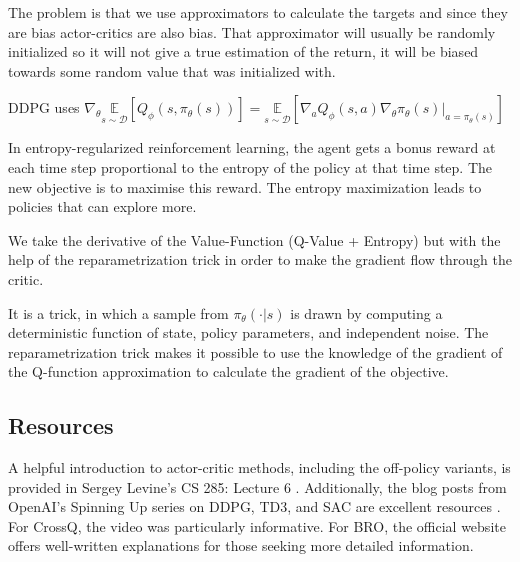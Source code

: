 \begin{enumerate}
\newline
The problem is that we use approximators to calculate the targets and since they are bias actor-critics are also bias. That approximator will usually be randomly initialized so it will not give a true estimation of the return, it will be biased towards some random value that was initialized with.

\newline DDPG uses $ \nabla_\theta  \underset{s\sim \mathcal{D}}{\mathbb{E}}[Q_\phi(s,\pi_\theta(s))]
=  \underset{s\sim \mathcal{D}}{\mathbb{E}}\left[ \nabla_a Q_\phi(s,a) \nabla_\theta \pi_\theta(s)|_{a=\pi_\theta(s)}\right]
$

\newline In entropy-regularized reinforcement learning, the agent gets a bonus 
reward at each time step proportional to the entropy of the policy at that time step. The 
new objective is to maximise this reward. The entropy maximization leads to policies that 
can explore more.

We take the derivative of the Value-Function (Q-Value + Entropy) but with the help 
of the reparametrization trick in order to make the gradient flow through the critic.

It is a trick, in which a sample from $\pi_{\theta}(\cdot|s)$ is drawn by computing a deterministic function of state, policy parameters, and independent noise. The reparametrization trick makes it possible to use the knowledge of the gradient of the Q-function approximation to calculate the gradient of the objective.
\end{enumerate}

\subsection{Resources}
A helpful introduction to actor-critic methods, including the off-policy variants, is provided in Sergey Levine’s CS 285: 
Lecture 6 \cite{CS285,CS285LevineYoutube}. Additionally, the blog posts from OpenAI's Spinning Up series on DDPG, TD3, and SAC 
are excellent resources \cite{OpenAI_Spinning_UP}. For CrossQ, the video \cite{CrossQ_Talk} was particularly informative. For 
BRO, the official website \cite{BRO_Website} offers well-written explanations for those seeking more detailed information.
